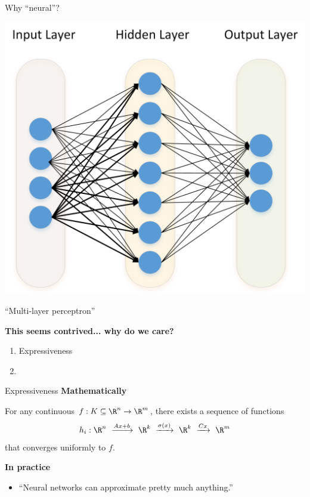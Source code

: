 \begin{frame}{Why ``neural''?}
	\begin{center}
		\includegraphics[width = .7 \textwidth]{neural-net.png}
	\end{center}

	\pause

	\begin{center}
		``Multi-layer perceptron''
	\end{center}
\end{frame}

\begin{frame}
	\begin{center}
		\textbf{This seems contrived... why do we care?}
	\end{center}

	\bigskip \pause

	\begin{center}
		\begin{enumerate}
			\item Expressiveness
			\item
		\end{enumerate}
	\end{center}
\end{frame}

\begin{frame}{Expressiveness}
	\textbf{Mathematically}

	For any continuous $f : K \subseteq \R^n \to \R^m$, there exists a sequence of functions
	\begin{equation*}
		h_i :
		\R^n
		\ \xrightarrow{Ax + b} \ \R^k
		\ \xrightarrow{\sigma(x)} \  \R^k
		\ \xrightarrow{Cx} \ \R^m
	\end{equation*}
	that converges uniformly to $f$.

	\pause \bigskip

	\textbf{In practice}

	\begin{itemize}
		\item ``Neural networks can approximate pretty much anything.''
	\end{itemize}
\end{frame}

